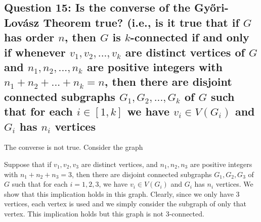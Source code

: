 \documentclass[letterpaper, 11pt]{article}
\newcommand{\1}{\mathds{1}}	%
\theoremstyle{definition}
\begin{document}
\subsection*{Question 15: Is the converse of the Győri-Lovász Theorem true? (i.e., is it true that if $G$ has order $n$, then $G$ is $k$-connected if and only if whenever $v_1,v_2,...,v_k$ are distinct vertices of $G$ and $n_1,n_2,...,n_k$ are positive integers with $n_1+n_2+...+n_k = n$, then there are disjoint connected subgraphs $G_1, G_2, ..., G_k$ of $G$ such that for each $i \in [1,k]$ we have $v_i \in V(G_i)$ and $G_i$ has $n_i$ vertices}
The converse is not true. Consider the graph \\ 
\begin{center}
\end{center}
Suppose that if $v_1, v_2, v_3$ are distinct vertices, and $n_1, n_2, n_3$ are positive integers with $n_1+n_2 +n_3= 3$, then there are disjoint connected subgraphs $G_1, G_2, G_3$ of $G$ such that for each $i=1,2,3$, we have $v_i \in V(G_i)$ and $G_i$ has $n_i$ vertices. We show that this implication holds in this graph. Clearly, since we only have 3 vertices, each vertex is used and we simply consider the subgraph of only that vertex. This implication holds but this graph is not 3-connected.
\end{document}
